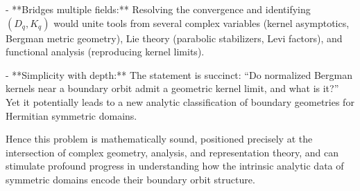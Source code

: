 - **Bridges multiple fields:**  
   Resolving the convergence and identifying \( (D_q,K_q) \) would unite tools from several complex variables (kernel asymptotics, Bergman metric geometry), Lie theory (parabolic stabilizers, Levi factors), and functional analysis (reproducing kernel limits).

- **Simplicity with depth:**  
   The statement is succinct: “Do normalized Bergman kernels near a boundary orbit admit a geometric kernel limit, and what is it?” Yet it potentially leads to a new analytic classification of boundary geometries for Hermitian symmetric domains.

Hence this problem is mathematically sound, positioned precisely at the intersection of complex geometry, analysis, and representation theory, and can stimulate profound progress in understanding how the intrinsic analytic data of symmetric domains encode their boundary orbit structure.